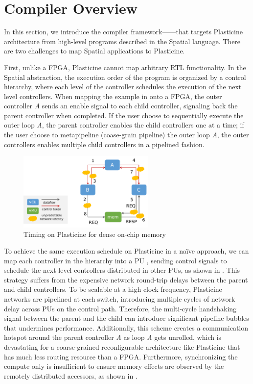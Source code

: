 \section{\name Compiler Overview} \label{sec:compileroverview}

In this section, we introduce the compiler framework---\name---that targets Plasticine
architecture from high-level programs described in the Spatial language. 
There are two challenges to map Spatial applications to Plasticine. 

First, unlike a FPGA, Plasticine cannot map arbitrary RTL functionality.
In the Spatial abstraction, the execution order of the program is organized by a control hierarchy, where
each level of the controller schedules the execution of the next level controllers.
When mapping the example in  onto a FPGA, the outer controller \emph{A}
sends an enable signal to each child controller, signaling back the parent controller when
completed. If the user choose to sequentially execute the outer loop \emph{A}, the parent
controller enables the child controllers one at a time; if the user choose to metapipeline
(coase-grain pipeline) the outer loop \emph{A}, the outer controllers enables multiple child
controllers in a pipelined fashion.

\begin{figure}
\centering
  \centering
\includegraphics[width=0.6\textwidth]{figs/centralctrl.pdf}
\caption{Timing on Plasticine for dense on-chip memory}
\label{fig:centralctrl}
\end{figure}

To achieve the same execution schedule on Plasticine in a na\"ive approach, 
we can map each controller in the hierarchy into a PU
, sending control signals to schedule the next level 
controllers distributed in other PUs, as shown in .
This strategy suffers from the expensive network round-trip delays between the parent and child controllers.
To be scalable at a high clock frequency, Plasticine networks are pipelined at each switch,
introducing multiple cycles of network delay across PUs on the control path.
Therefore, the multi-cycle handshaking signal between the parent and the child can introduce significant pipeline bubbles
that undermines performance.
Additionally, this scheme creates a communication hotspot around the parent controller \emph{A} as
loop \emph{A} gets unrolled, which is devastating for a coarse-grained reconfigurable architecture
like Plasticine that has much less routing resource than a FPGA.
Furthermore, synchronizing the compute only is insufficient to ensure memory effects are observed by
the remotely distributed accessors, as shown in .

